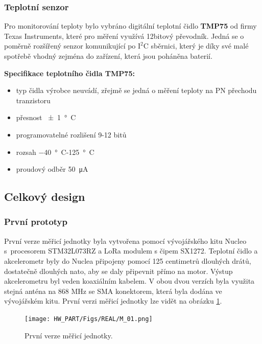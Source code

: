 \subsubsection{Teplotní senzor}
    Pro monitorování teploty bylo vybráno digitální teplotní čidlo \textbf{TMP75} od firmy Texas Instruments, které pro měření využívá 12bitový převodník. Jedná se o poměrně rozšířený senzor komunikující po $\text{I}^2\text{C}$ sběrnici, který je díky své malé spotřebě vhodný zejména do zařízení, která jsou poháněna baterií.
    
    \textbf{Specifikace teplotního čidla TMP75:} \cite{manual:4}
        \begin{itemize}
            \item typ čidla výrobce neuvádí, zřejmě se jedná o měření teploty na PN přechodu tranzistoru
            \item přesnost \SI{\pm 1}{\degree C}
            \item programovatelné rozlišení 9-12 bitů
            \item rozsah \SI{-40}{\degree C}-\SI{+125}{\degree C}
            \item proudový odběr \SI{50} {\micro\ampere}
        \end{itemize}
        
       

     
 

\subsection{Celkový design} 

\subsubsection{První prototyp}
    První verze měřicí jednotky byla vytvořena pomocí vývojářského kitu Nucleo s~procesorem STM32L073RZ a LoRa modulem s čipem SX1272. Teplotní čidlo a akcelerometr byly do Nuclea připojeny pomocí 125 centimetrů dlouhých drátů, dostatečně dlouhých nato, aby se daly připevnit přímo na motor. Výstup akcelerometru byl veden koaxiálním kabelem. V obou dvou verzích  byla využita stejná anténa na 868 MHz se SMA konektorem, která byla dodána ve vývojářském kitu.
    První verzi měřicí jednotky lze vidět na obrázku \ref{figure:first_prototype}.

     \begin{figure} [!htp]
    	    \centering
    	    \texttt{[image: HW\_PART/Figs/REAL/M\_01.png]}
            \caption {První verze měřicí jednotky.}
            \label{figure:first_prototype}
    \end{figure} 
    
